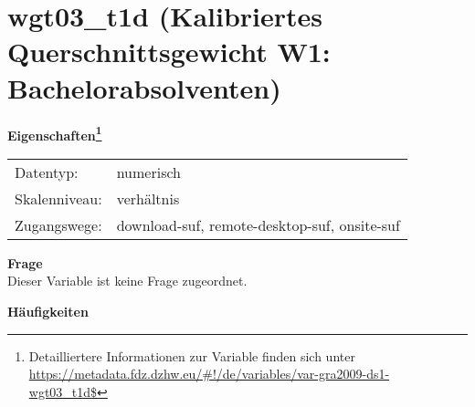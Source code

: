 
    \setcounter{footnote}{0}

    \vspace*{-1.8cm}
	\section{wgt03\_t1d (Kalibriertes Querschnittsgewicht W1: Bachelorabsolventen)}
	\label{section:wgt03_t1d}



    \vspace*{0.5cm}
    \noindent\textbf{Eigenschaften\footnote{Detailliertere Informationen zur Variable finden sich unter
		\url{https://metadata.fdz.dzhw.eu/\#!/de/variables/var-gra2009-ds1-wgt03_t1d$}}}\\
	\begin{tabularx}{\hsize}{@{}lX}
	Datentyp: & numerisch \\
	Skalenniveau: & verhältnis \\
	Zugangswege: &
	  download-suf, 
	  remote-desktop-suf, 
	  onsite-suf
 \\
    \end{tabularx}



		\vspace*{0.5cm}
		\noindent\textbf{Frage}\\
		Dieser Variable ist keine Frage zugeordnet.





        		\vspace*{0.5cm}
                \noindent\textbf{Häufigkeiten}

